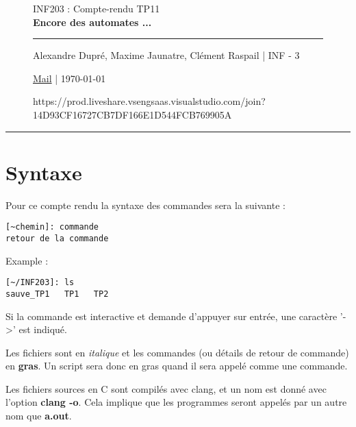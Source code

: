 \documentclass[12pt,a4paper,notitlepage,colorinlistoftodos]{article}
\begin{document}
\begin{figure}
    \begin{minipage}{.75\textwidth}
    \begin{center}
    {\Large INF203 : Compte-rendu TP11 \\ \textbf{Encore des automates ...}}
    \end{center}
    \rule{7em}{.4pt}\par
     Alexandre Dupré, Maxime Jaunatre, Clément Raspail | INF - 3 \par 
     \href{mailto:alexandre.dupre@etu.univ-grenoble-alpes.fr,maxime.jaunatre@etu.univ-grenoble-alpes.fr, clement.raspail@etu.univ-grenoble-alpes.fr}{Mail} | \today
\end{minipage}https://prod.liveshare.vsengsaas.visualstudio.com/join?14D93CF16727CB7DF166E1D544FCB769905A
\end{figure}

\hrule

\section*{Syntaxe}

\iffalse
 Alexandre Dupré <alexandre.dupre@etu.univ-grenoble-alpes.fr>
 Maxime Jaunatre <maxime.jaunatre@etu.univ-grenoble-alpes.fr> 
 Clément Raspail <clement.raspail@etu.univ-grenoble-alpes.fr>
\fi

Pour ce compte rendu la syntaxe des commandes sera la suivante :
\begin{lstlisting}
[~chemin]: commande
retour de la commande
\end{lstlisting}

Example :
\begin{lstlisting}
[~/INF203]: ls
sauve_TP1   TP1   TP2
\end{lstlisting}

Si la commande est interactive et demande d'appuyer  sur entrée, une caractère '->' est indiqué.

Les fichiers sont en \textit{italique} et les commandes (ou détails de retour de commande) en \textbf{gras}. Un script sera donc en gras quand il sera appelé comme une commande.


Les fichiers sources en C sont compilés avec clang, et un nom est donné avec l'option \textbf{clang -o}. Cela implique que les programmes seront appelés par un autre nom que \textbf{a.out}.
\end{document}
